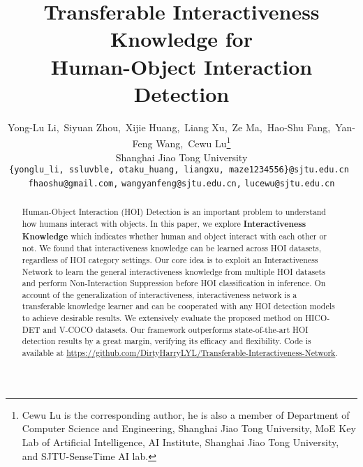 \documentclass[10pt,twocolumn,letterpaper]{article}
\begin{document}
\title{Transferable Interactiveness Knowledge for \\Human-Object Interaction Detection}
\author{Yong-Lu Li,~Siyuan Zhou,~Xijie Huang,~Liang Xu,~Ze Ma,~Hao-Shu Fang,~Yan-Feng Wang,~Cewu Lu\thanks{Cewu Lu is the corresponding author, he is also a member of Department of Computer Science and Engineering, Shanghai Jiao Tong University, MoE Key Lab of Artificial Intelligence, AI Institute, Shanghai Jiao Tong University, and SJTU-SenseTime AI lab.}\\
Shanghai Jiao Tong University\\
{\tt\small \{yonglu\_li, ssluvble, otaku\_huang, liangxu, maze1234556\}@sjtu.edu.cn }\\
{\tt\small fhaoshu@gmail.com,}
{\tt\small wangyanfeng@sjtu.edu.cn,}
{\tt\small lucewu@sjtu.edu.cn}
}

\maketitle


\begin{abstract}
Human-Object Interaction (HOI) Detection is an important problem to understand how humans interact with objects. In this paper, we explore \textbf{Interactiveness Knowledge} which indicates whether human and object interact with each other or not. We found that interactiveness knowledge can be learned across HOI datasets, regardless of HOI category settings. Our core idea is to exploit an Interactiveness Network to learn the general interactiveness knowledge from multiple HOI datasets and perform Non-Interaction Suppression before HOI classification in inference. On account of the generalization of interactiveness, interactiveness network is a transferable knowledge learner and can be cooperated with any HOI detection models to achieve desirable results.
We extensively evaluate the proposed method on HICO-DET and V-COCO datasets. Our framework outperforms state-of-the-art HOI detection results by a great margin, verifying its efficacy and flexibility. Code is available at \url{https://github.com/DirtyHarryLYL/Transferable-Interactiveness-Network}.
\end{abstract}
   
\end{document}
